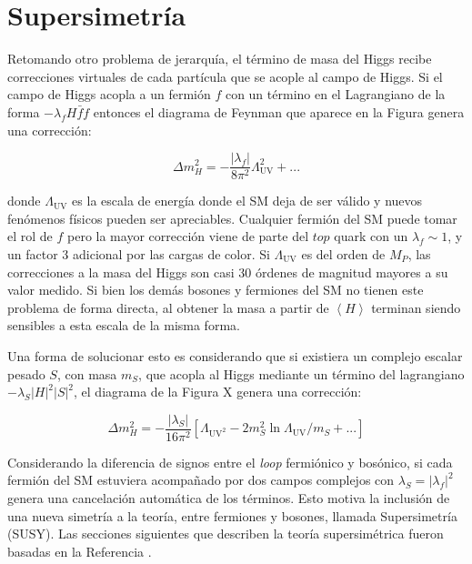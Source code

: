 \section{Supersimetría}

Retomando otro problema de jerarquía, el término de masa del Higgs recibe correcciones virtuales de cada partícula que se acople al campo de Higgs. Si el campo de Higgs acopla a un fermión $f$ con un término en el Lagrangiano de la forma $-\lambda_f H \bar{f} f$ entonces el diagrama de Feynman que aparece en la Figura  genera una corrección:

\begin{equation}
	\Delta m_H^2 = - \frac{|\lambda_f|}{8 \pi^2}\Lambda_{\text{UV}}^2 + ...
\end{equation}

donde $\Lambda_{\text{UV}}$ es la escala de energía donde el SM deja de ser válido y nuevos fenómenos físicos pueden ser apreciables. Cualquier fermión del SM puede tomar el rol de $f$ pero la mayor corrección viene de parte del $top$ quark con un $\lambda_f\sim1$, y un factor 3 adicional por las cargas de color. Si $\Lambda_{\text{UV}}$ es del orden de $M_P$, las correcciones a la masa del Higgs son casi 30 órdenes de magnitud mayores a su valor medido. Si bien los demás bosones y fermiones del SM no tienen este problema de forma directa, al obtener la masa a partir de $\left<H\right>$ terminan siendo sensibles a esta escala de la misma forma.

 Una forma de solucionar esto es considerando que si existiera un complejo escalar pesado $S$, con masa $m_S$, que acopla al Higgs mediante un término del lagrangiano $-\lambda_S |H|^2|S|^2$, el diagrama de la Figura X genera una corrección:

\begin{equation}
	\Delta m_H^2 = - \frac{|\lambda_S|}{16 \pi^2}\left[\Lambda_{\text{UV}^2} - 2m_S^2 \ln{\Lambda_{\text{UV}}/m_S} + ... \right]
\end{equation}

Considerando la diferencia de signos entre el \textit{loop} fermiónico y bosónico, si cada fermión del SM estuviera acompañado por dos campos complejos con $\lambda_S = |\lambda_f|^2$ genera una cancelación automática de los términos. Esto motiva la inclusión de una nueva simetría a la teoría, entre fermiones y bosones, llamada Supersimetría (SUSY). Las secciones siguientes que describen la teoría supersimétrica fueron basadas en la Referencia \cite{martin}.

